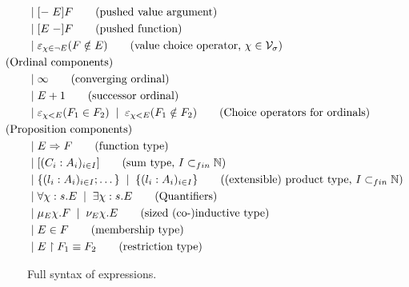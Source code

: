 \begin{figure}
\begin{align*}
    \bnfor &[-\;E]F                \tag{pushed value argument}\\
    \bnfor &[E\;-]F                \tag{pushed function}\\
    \bnfor &\varepsilon_{\chi \in \lnot E}(F \notin E)
      \tag{value choice operator, $\chi \in \mathcal{V}_\sigma$}\\
    &\hspace{-1cm}\text{(Ordinal components)}\\
    \bnfor &\infty                 \tag{converging ordinal}\\
    \bnfor &E+1                    \tag{successor ordinal}\\
    \bnfor &\varepsilon_{\chi<E}(F_1 \in F_2) \bnfor
      \varepsilon_{\chi<E}(F_1 \notin F_2)
      \tag{Choice operators for ordinals}\\
    &\hspace{-1cm}\text{(Proposition components)}\\
    \bnfor &E \Rightarrow F        \tag{function type}\\
    \bnfor &[(C_i : A_i)_{i \in I}]
      \tag{sum type, $I \subset_{fin} \mathbb{N}$}\\
    \bnfor &\{(l_i : A_i)_{i \in I}; \dots\} \bnfor \{(l_i : A_i)_{i \in I}\}
      \tag{(extensible) product type, $I \subset_{fin} \mathbb{N}$}\\
    \bnfor &\forall \chi:s.E \bnfor \exists \chi:s.E
      \tag{Quantifiers}\\
    \bnfor &\mu_E \chi.F \bnfor \nu_E \chi.E
      \tag{sized (co-)inductive type}\\
    \bnfor &E \in F                \tag{membership type}\\
    \bnfor &E \restriction F_1 \equiv F_2 \tag{restriction type}
  \end{align*}
  \caption{Full syntax of expressions.}
  \label{expr}
\end{figure}
